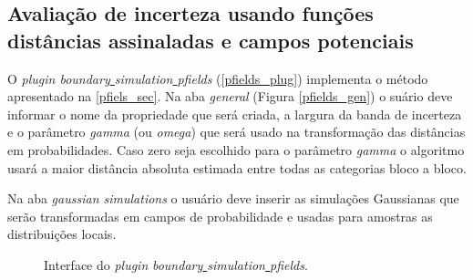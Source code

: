 \subsection{Avaliação de incerteza usando funções distâncias assinaladas e campos potenciais}

O \textit{plugin boundary\underline{ }simulation\underline{ }pfields} (\autoref{pfields_plug}) implementa o método apresentado na \autoref{pfiels_sec}. Na aba \textit{general} (Figura \autoref{pfields_gen}) o suário deve informar o nome da propriedade que será criada, a largura da banda de incerteza e o parâmetro \textit{gamma} (ou \textit{omega}) que será usado na transformação das distâncias em probabilidades. Caso zero seja escolhido para o parâmetro \textit{gamma} o algoritmo usará a maior distância absoluta estimada entre todas as categorias bloco a bloco.

Na aba \textit{gaussian simulations} o usuário deve inserir as simulações Gaussianas que serão transformadas em campos de probabilidade e usadas para amostras as distribuições locais.

\begin{figure}[H] 
    \centering
    \caption{Interface do \textit{plugin} \textit{boundary\underline{ }simulation\underline{ }pfields}.} \label{pfields_plug}
     \hspace{1em}
\end{figure}


